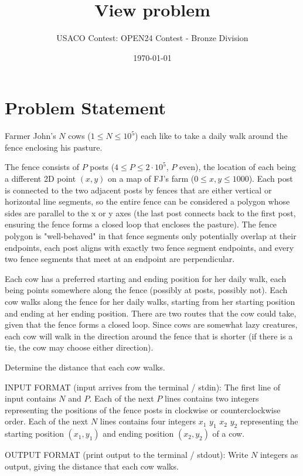 \documentclass[12pt]{article}
\title{View problem}
\author{USACO Contest: OPEN24 Contest - Bronze Division}
\date{\today}
\begin{document}
\maketitle

\section*{Problem Statement}


Farmer John's $N$ cows ($1 \leq N \leq 10^5$) each like to take a daily walk
around the fence enclosing his pasture. 

The fence consists of $P$ posts ($4 \leq P \leq 2\cdot 10^5$, $P$ even), the
location of each being a different 2D point $(x,y)$ on a map of FJ's farm
($0 \leq x, y \leq 1000$).  Each post is connected to the two adjacent posts by
fences that are either vertical  or horizontal line segments, so the entire
fence can be considered a polygon whose sides are parallel to the x or y axes
(the last post connects back to the first post, ensuring the fence forms a
closed loop that encloses the pasture).  The fence polygon is "well-behaved" in
that fence segments only potentially overlap at their endpoints, each post
aligns with exactly  two fence segment endpoints, and every two fence segments
that meet at an endpoint are perpendicular.  

Each cow has a preferred starting and ending position for her daily walk, each
being points somewhere along the fence (possibly at posts, possibly not).  Each
cow walks along the fence for her daily walks, starting from her starting
position and ending at her ending position.  There are two routes that the cow
could take, given that the fence forms a closed loop. Since cows are somewhat
lazy creatures, each cow will walk in the direction around the fence that is
shorter (if there is a tie, the cow may choose either direction). 

Determine the distance that each cow walks.

INPUT FORMAT (input arrives from the terminal / stdin):
The first line of input contains $N$ and $P$. Each of the next $P$ lines
contains two integers representing the positions of the fence posts in clockwise
or counterclockwise order. Each of the next $N$ lines contains four integers
$x_1$ $y_1$ $x_2$ $y_2$ representing the starting position $(x_1, y_1)$ and
ending position $(x_2, y_2)$ of a cow.

OUTPUT FORMAT (print output to the terminal / stdout):
Write $N$ integers as output, giving the distance that each cow walks.
\end{document}
